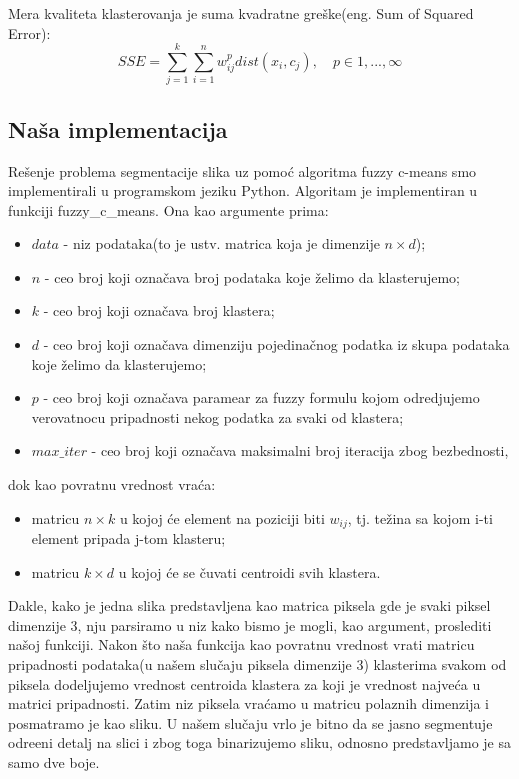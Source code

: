 \documentclass{article}
\begin{document}
Mera kvaliteta klasterovanja je suma kvadratne gre\v{s}ke(eng. {\selectfont Sum of Squared Error}):
\begin{equation}
SSE = \sum_{j=1}^k\sum_{i=1}^n w_{ij}^p dist(x_i, c_j), \quad p \in 1,...,\infty
\end{equation}

\subsection{\selectfont Na\v{s}a implementacija}

Re\v{s}enje problema segmentacije slika uz pomo\'{c} algoritma {\selectfont fuzzy c-means} smo implementirali u programskom jeziku {\selectfont Python}. Algoritam je implementiran u funkciji {\selectfont fuzzy\_c\_means}. Ona kao argumente prima:
\begin{itemize}
\item $data$ - niz podataka(to je ustv. matrica koja je dimenzije $n \times d$);
\item $n$ - ceo broj koji ozna\v{c}ava broj podataka koje \v{z}elimo da klasterujemo;
\item $k$ - ceo broj koji ozna\v{c}ava broj klastera;
\item $d$ - ceo broj koji ozna\v{c}ava dimenziju pojedina\v{c}nog podatka iz skupa podataka koje \v{z}elimo da klasterujemo;
\item $p$ - ceo broj koji ozna\v{c}ava paramear za {\selectfont fuzzy} formulu kojom odredjujemo verovatnocu pripadnosti nekog podatka za svaki od klastera;
\item $max\_iter$ - ceo broj koji ozna\v{c}ava maksimalni broj iteracija zbog bezbednosti,
\end{itemize}
dok kao povratnu vrednost vra\'{c}a:
\begin{itemize} 
\item matricu $n \times k$ u kojoj \'{c}e element na poziciji biti $w_{ij}$, tj. te\v{z}ina sa kojom {\selectfont i}-ti element pripada {\selectfont j}-tom klasteru;
\item matricu $k \times d$ u kojoj \'{c}e se \v{c}uvati centroidi svih klastera.
\end{itemize}
Dakle, kako je jedna slika predstavljena kao matrica piksela gde je svaki piksel dimenzije 3, nju parsiramo u niz kako bismo je mogli, kao argument, proslediti na\v{s}oj funkciji. Nakon \v{s}to na\v{s}a funkcija kao povratnu vrednost vrati matricu pripadnosti podataka(u na\v{s}em slu\v{c}aju piksela dimenzije 3) klasterima svakom od piksela dodeljujemo vrednost centroida klastera za koji je vrednost najve\'ca u matrici pripadnosti. Zatim niz piksela vra\'{c}amo u matricu polaznih dimenzija i posmatramo je kao sliku. U na\v{s}em slu\v{c}aju vrlo je bitno da se jasno segmentuje odre\dj eni detalj na slici i zbog toga binarizujemo sliku, odnosno predstavljamo je sa samo dve boje.\\
\end{document}
